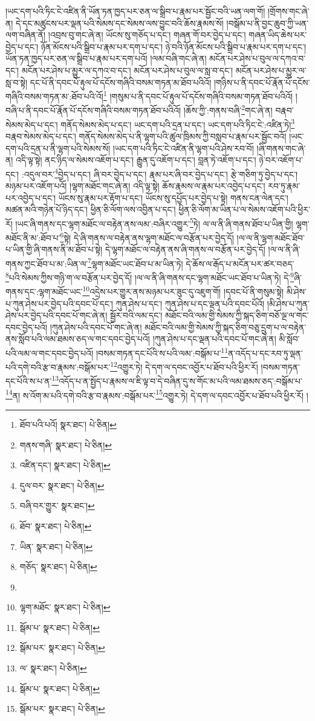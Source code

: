 །ཡང་དག་པའི་ཏིང་ངེ་འཛིན་ནི་ཡོན་ཏན་ཁྱད་པར་ཅན་ལ་སྒྲིབ་པ་རྣམ་པར་སྦྱོང་བའི་ཡན་ལག་གོ། །གྲོགས་གང་ཞེ་ན། དེ་དང་མཚུངས་པར་ལྡན་པའི་སེམས་དང་སེམས་ལས་བྱུང་བའི་ཆོས་རྣམས་སོ། །བསྒོམ་པ་ནི་བྱང་ཆུབ་ཀྱི་ཡན་ལག་བཞིན་ནོ། །འབྲས་བུ་གང་ཞེ་ན། ཡོངས་སུ་གཅོད་པ་དང་། གཞན་གོ་བར་བྱེད་པ་དང་། གཞན་ཡིད་ཆེས་པར་བྱེད་པ་དང་། ཉོན་མོངས་པའི་སྒྲིབ་པ་རྣམ་པར་དག་པ་དང་། ཉེ་བའི་ཉོན་མོངས་པའི་སྒྲིབ་པ་རྣམ་པར་དག་པ་དང་། ཡོན་ཏན་ཁྱད་པར་ཅན་ལ་སྒྲིབ་པ་རྣམ་པར་དག་པའོ། །ལམ་བཞི་གང་ཞེ་ན། མངོན་པར་ཤེས་པ་བུལ་ལ་དཀའ་བ་དང་། མངོན་པར་ཤེས་པ་མྱུར་ལ་དཀའ་བ་དང་། མངོན་པར་ཤེས་པ་བུལ་ལ་སླ་བ་དང་། མངོན་པར་ཤེས་པ་མྱུར་ལ་སླ་བ་སྟེ། དང་པོ་ནི་དབང་པོ་རྟུལ་པོ་དངོས་གཞིའི་བསམ་གཏན་མ་ཐོབ་པའིའོ། །གཉིས་པ་ནི་དབང་པོ་རྣོན་པོ་དངོས་གཞིའི་བསམ་གཏན་མ་:ཐོབ་པའི་འོ།\footnote{ཐོབ་པའི་པའོ།  སྣར་ཐང་།  པེ་ཅིན། } །གསུམ་པ་ནི་དབང་པོ་རྟུལ་པོ་དངོས་གཞིའི་བསམ་གཏན་ཐོབ་པའིའོ། །བཞི་པ་ནི་དབང་པོ་རྣོན་པོ་དངོས་གཞིའི་བསམ་གཏན་ཐོབ་པའིའོ། །ཆོས་ཀྱི་:གནས་བཞི་\footnote{གནས་གཞི་  སྣར་ཐང་།  པེ་ཅིན། }གང་ཞེ་ན། བརྣབ་སེམས་མེད་པ་དང་། གནོད་སེམས་མེད་པ་དང་། ཡང་དག་པའི་དྲན་པ་དང་། ཡང་དག་པའི་ཏིང་ངེ་:འཛིན་ཏེ།\footnote{འཛིན་དང་།  སྣར་ཐང་།  པེ་ཅིན། } བརྣབ་སེམས་མེད་པ་དང་། གནོད་སེམས་མེད་པ་ནི་ལྷག་པའི་ཚུལ་ཁྲིམས་ཀྱི་བསླབ་པ་རྣམ་པར་སྦྱོང་བའོ། །ཡང་དག་པའི་དྲན་པ་ནི་ལྷག་པའི་སེམས་སོ། །ཡང་དག་པའི་ཏིང་ངེ་འཛིན་ནི་ལྷག་པའི་ཤེས་རབ་བོ། །ཞི་གནས་གང་ཞེ་ན། འདི་ལྟ་སྟེ། ནང་ཉིད་ལ་སེམས་འཇོག་པ་དང་། རྒྱུན་དུ་འཇོག་པ་དང་། བླན་ཏེ་འཇོག་པ་དང་། ཉེ་བར་འཇོག་པ་དང་། :འདུལ་བར་\footnote{དུལ་བར་  སྣར་ཐང་།  པེ་ཅིན། }བྱེད་པ་དང་། ཞི་བར་བྱེད་པ་དང་། རྣམ་པར་ཞི་བར་བྱེད་པ་དང་། རྩེ་གཅིག་ཏུ་བྱེད་པ་དང་། མཉམ་པར་འཇོག་པའོ། །ལྷག་མཐོང་གང་ཞེ་ན། འདི་ལྟ་སྟེ། ཆོས་རྣམས་ལ་རྣམ་པར་འབྱེད་པ་དང་། རབ་ཏུ་རྣམ་པར་འབྱེད་པ་དང་། ཡོངས་སུ་རྣམ་པར་རྟོག་པ་དང་། ཡོངས་སུ་དཔྱོད་པར་བྱེད་པ་སྟེ། གནས་ངན་ལེན་དང་། མཚན་མའི་གཉེན་པོ་ཉིད་དང་། ཕྱིན་ཅི་ལོག་ལས་འབྱིན་པ་དང་། ཕྱིན་ཅི་ལོག་མ་ཡིན་པ་ལ་སེམས་འཇོག་པའི་ཕྱིར་རོ། །ཡང་ཞི་གནས་དང་ལྷག་མཐོང་ལ་བརྟེན་ནས་ལམ་:བཞིར་འགྱུར་\footnote{བཞི་བར་གྱུར་  སྣར་ཐང་། }ཏེ། ལ་ལ་ནི་ཞི་གནས་ཐོབ་པ་ཡིན་གྱི། ལྷག་མཐོང་ནི་མ་:ཐོབ་པ་\footnote{ཐོབ་  སྣར་ཐང་།  པེ་ཅིན། }སྟེ། དེ་ཞི་གནས་ལ་བརྟེན་ནས་ལྷག་མཐོང་ལ་བརྩོན་པར་བྱེད་དོ། །ལ་ལ་ནི་ལྷག་མཐོང་ཐོབ་པ་ཡིན་གྱི་ཞི་གནས་ནི་མ་ཐོབ་པ་སྟེ། དེ་ལྷག་མཐོང་ལ་བརྟེན་ནས་ཞི་གནས་ལ་བརྩོན་པར་བྱེད་དོ། །ལ་ལ་ནི་ཞི་གནས་ཀྱང་ཐོབ་པ་མ་:ཡིན་ལ་\footnote{ཡིན་  སྣར་ཐང་།  པེ་ཅིན། }ལྷག་མཐོང་ཡང་ཐོབ་པ་མ་ཡིན་ཏེ། དེ་ཆོས་ལ་རྒོད་པ་མངོན་པར་ཚར་བཅད་\footnote{གཅོད་  སྣར་ཐང་།  པེ་ཅིན། }པའི་སེམས་ཀྱིས་གཉི་ག་ལ་བརྩོན་པར་བྱེད་དོ། །ལ་ལ་ནི་ཞི་གནས་དང་ལྷག་མཐོང་ཡང་ཐོབ་པ་ཡིན་ཏེ། དེ་\footnote{}ཞི་གནས་དང་:ལྷག་མཐོང་ཡང་\footnote{ལྷག་མཐོང་  སྣར་ཐང་།  པེ་ཅིན། }འདྲེས་པར་གྱུར་ནས་མཉམ་པར་ཟུང་དུ་འཇུག་གོ། །དབང་པོ་ནི་གསུམ་སྟེ། མི་ཤེས་པ་ཀུན་ཤེས་པར་བྱེད་པའི་དབང་པོ་དང་། ཀུན་ཤེས་པ་དང་། ཀུན་ཤེས་པ་དང་ལྡན་པའི་དབང་པོའོ། །མི་ཤེས་པ་ཀུན་ཤེས་པར་བྱེད་པའི་དབང་པོ་གང་ཞེ་ན། སྦྱོར་བའི་ལམ་དང་། མཐོང་བའི་ལམ་གྱི་སེམས་ཀྱི་སྐད་ཅིག་བཅོ་ལྔ་ལ་གང་དབང་བྱེད་པའོ། །ཀུན་ཤེས་པའི་དབང་པོ་གང་ཞེ་ན། མཐོང་བའི་ལམ་གྱི་སེམས་ཀྱི་སྐད་ཅིག་བཅུ་དྲུག་པ་ལ་བརྟེན་ནས་སློབ་པའི་ལམ་ཐམས་ཅད་ལ་གང་དབང་བྱེད་པའོ། །ཀུན་ཤེས་པ་དང་ལྡན་པའི་དབང་པོ་གང་ཞེ་ན། མི་སློབ་པའི་ལམ་ལ་གང་དབང་བྱེད་པའོ། །བསམ་གཏན་དང་པོའི་ས་པའི་ལམ་:བསྒོམ་པ་\footnote{སྒོམ་པ་  སྣར་ཐང་།  པེ་ཅིན། }ན་འདོད་པ་དང་རབ་ཏུ་ལྡན་པའི་དགེ་བའི་རྩ་བ་རྣམས་:བསྒོམ་པར་\footnote{སྒོམ་པར་  སྣར་ཐང་།  པེ་ཅིན། }འགྱུར་ཏེ། དེ་དག་ལ་དབང་འབྱོར་པ་ཐོབ་པའི་ཕྱིར་རོ། །བསམ་གཏན་དང་པོའི་ས་པ་ན་\footnote{ལ་  སྣར་ཐང་།  པེ་ཅིན། }འདོད་པ་ན་སྤྱོད་པ་རྣམས་ལ་ཇི་ལྟ་བ་དེ་བཞིན་དུ་ས་གོང་མ་པའི་ལམ་ཐམས་ཅད་:བསྒོམ་པ་\footnote{སྒོམ་པ་  སྣར་ཐང་།  པེ་ཅིན། }ན། ས་འོག་མ་པའི་དགེ་བའི་རྩ་བ་རྣམས་:བསྒོམ་པར་\footnote{སྒོམ་པར་  སྣར་ཐང་།  པེ་ཅིན། }འགྱུར་ཏེ། དེ་དག་ལ་དབང་འབྱོར་པ་ཐོབ་པའི་ཕྱིར་རོ། །
